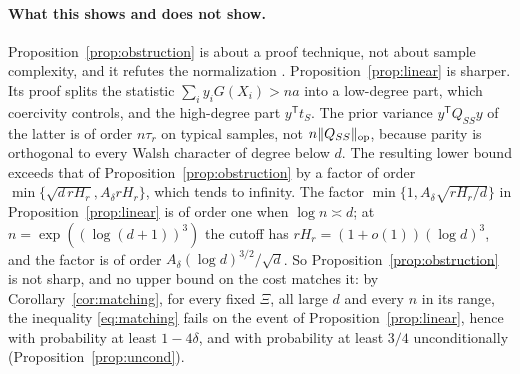 \documentclass[11pt]{article}
\theoremstyle{definition}\newtheorem{assumption}[theorem]{Assumption}
\theoremstyle{remark}\newtheorem{remark}[theorem]{Remark}
\begin{document}
\paragraph{What this shows and does not show.}
Proposition~\ref{prop:obstruction} is about a proof technique, not about
sample complexity, and it refutes the normalization
\cite[eq.~(42)]{subcritical}.
Proposition~\ref{prop:linear} is sharper. Its proof splits the statistic
$\sum_iy_iG(X_i)>na$ into a low-degree part, which coercivity controls, and
the high-degree part $y^{\mathsf T}t_S$. The prior variance
$y^{\mathsf T}Q_{SS}y$ of the latter is of order $n\tau_r$ on typical
samples, not $n\|Q_{SS}\|_{\rm op}$, because parity is orthogonal to every
Walsh character of degree below $d$. The resulting lower bound exceeds that
of Proposition~\ref{prop:obstruction} by a factor of order
$\min\{\sqrt{d\,rH_r},A_\delta rH_r\}$, which tends to infinity. The factor
$\min\{1,A_\delta\sqrt{rH_r/d}\}$ in Proposition~\ref{prop:linear} is of
order one when $\log n\asymp d$; at $n=\exp((\log(d+1))^3)$ the cutoff has
$rH_r=(1+o(1))(\log d)^3$, and the factor is of order
$A_\delta(\log d)^{3/2}/\sqrt d$. So Proposition~\ref{prop:obstruction} is
not sharp, and no upper bound on the cost matches it: by
Corollary~\ref{cor:matching}, for every fixed $\Xi$, all large $d$ and every
$n$ in its range, the inequality \eqref{eq:matching} fails on the event of
Proposition~\ref{prop:linear}, hence with probability at least $1-4\delta$,
and with probability at least $3/4$ unconditionally
(Proposition~\ref{prop:uncond}).
\end{document}
